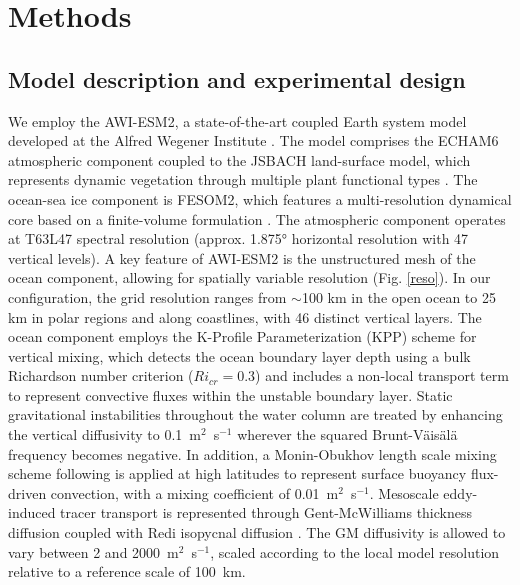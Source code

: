 \documentclass[draft]{agujournal2025}
\begin{document}
\section{Methods}

\subsection{Model description and experimental design}


We employ the AWI-ESM2, a state-of-the-art coupled Earth system model developed at the Alfred Wegener Institute \cite{sidorenko2019evaluation}. The model comprises the ECHAM6 atmospheric component \cite{stevens2013atmospheric} coupled to the JSBACH land-surface model, which represents dynamic vegetation through multiple plant functional types \cite{brovkin2009global,reick2021jsbach}. The ocean-sea ice component is FESOM2, which features a multi-resolution dynamical core based on a finite-volume formulation \cite{danilov2017finite}. The atmospheric component operates at T63L47 spectral resolution (approx. 1.875° horizontal resolution with 47 vertical levels). A key feature of AWI-ESM2 is the unstructured mesh of the ocean component, allowing for spatially variable resolution (Fig. \ref{reso}). In our configuration, the grid resolution ranges from $\sim$100 km in the open ocean to 25 km in polar regions and along coastlines, with 46 distinct vertical layers. 
  The ocean component employs the K-Profile Parameterization (KPP) scheme
  \cite{large1994oceanic} for vertical mixing, which detects the ocean boundary                       
  layer depth using a bulk Richardson number criterion ($Ri_{cr} = 0.3$) and                        
  includes a non-local transport term to represent convective fluxes within the                       
  unstable boundary layer. Static gravitational instabilities throughout the water                    
  column are treated by enhancing the vertical diffusivity to 0.1~m$^2$~s$^{-1}$                      
  wherever the squared Brunt-V\"{a}is\"{a}l\"{a} frequency becomes negative.                          
  In addition, a Monin-Obukhov length scale mixing scheme following                                   
   is applied at high latitudes to represent                     
  surface buoyancy flux-driven convection, with a mixing coefficient of                               
  0.01~m$^2$~s$^{-1}$. Mesoscale eddy-induced tracer transport is represented through                                      
  Gent-McWilliams thickness diffusion \cite{gent1990isopycnal,ferrari2008parameterization}         
  coupled with Redi isopycnal diffusion \cite{redi1982oceanic}.  The GM diffusivity                    
  is allowed to vary between 2 and 2000~m$^2$~s$^{-1}$, scaled according to the                       
  local model resolution relative to a reference scale of 100~km.    
\end{document}
